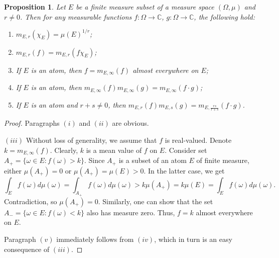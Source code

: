 \documentclass[12pt]{article}
\newtheorem{proposition}[theorem]{Proposition}
\begin{document}
\begin{proposition}\label{GnrlzdMeanProp}
    Let $E$ be a finite measure subset of a measure space $(\Omega,\mu)$ 
    and $r\neq 0$. Then for any measurable 
    functions $f:\Omega\to\mathbb{C}$, $g:\Omega\to\mathbb{C}$, the following 
    hold:
    \begin{enumerate}[label = (\roman*)]
        \item $m_{E,r}(\chi_E)=\mu(E)^{1/r}$;
        \item $m_{E,r}(f)=m_{E,r}(f\chi_E)$;
        \item If $E$ is an atom, then $f=m_{E,\infty}(f)$ almost 
        everywhere on $E$;
        \item If $E$ is an atom, 
        then $m_{E,\infty}(f)m_{E,\infty}(g)=m_{E,\infty}(f\cdot g)$;
        \item If $E$ is an atom and $r+s\neq 0$, 
        then $m_{E,r}(f)m_{E,s}(g)=m_{E,\frac{rs}{r+s}}(f\cdot g)$.
    \end{enumerate}
\end{proposition}
\begin{proof}
    Paragraphs $(i)$ and $(ii)$ are obvious.

    $(iii)$ Without loss of generality, we assume that $f$ is real-valued. 
    Denote $k=m_{E,\infty}(f)$. Clearly, $k$ is a mean value of $f$ on $E$. 
    Consider set $A_+=\{\omega\in E: f(\omega)>k\}$. Since $A_+$ is a subset of 
    an atom $E$ of finite measure, either $\mu(A_+)=0$ or $\mu(A_+)=\mu(E)>0$. 
    In the latter case, we get 
    \[
        \int_E f(\omega)d\mu(\omega)
        =\int_{A_+}f(\omega)d\mu(\omega)
        >k\mu(A_+)
        =k\mu(E)
        =\int_E f(\omega)d\mu(\omega).
    \]
    Contradiction, so $\mu(A_+)=0$. Similarly, one can show that the 
    set $A_-=\{\omega\in E:f(\omega)<k\}$ also has measure zero. Thus, $f=k$ 
    almost everywhere on $E$.

    Paragraph $(v)$ immediately follows from $(iv)$, which in turn is an easy 
    consequence of $(iii)$.
\end{proof}
\end{document}
